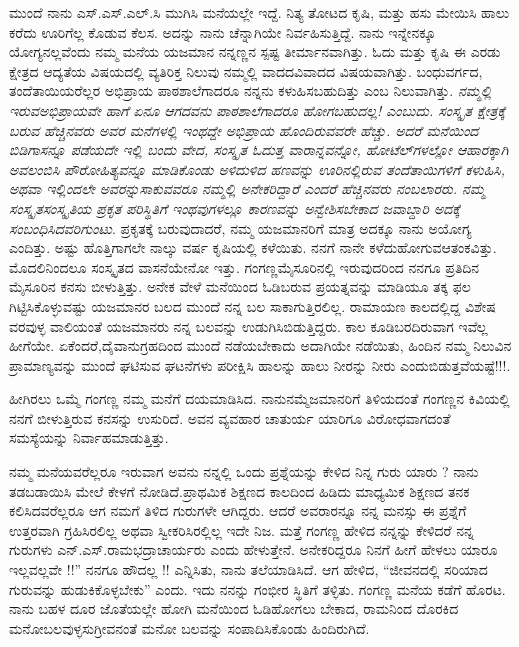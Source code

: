 {ಮುಂದೆ ನಾನು ಎಸ್.ಎಸ್.ಎಲ್.ಸಿ ಮುಗಿಸಿ ಮನೆಯಲ್ಲೇ ಇದ್ದೆ. ನಿತ್ಯ ತೋಟದ ಕೃಷಿ, ಮತ್ತು ಹಸು ಮೇಯಿಸಿ ಹಾಲು ಕರೆದು ಊರಿಗೆಲ್ಲ ಕೊಡುವ ಕೆಲಸ. ಅದನ್ನು ನಾನು ಚೆನ್ನಾಗಿಯೇ ನಿರ್ವಹಿಸುತ್ತಿದ್ದೆ. ನಾನು ಇನ್ನೇನಕ್ಕೂ ಯೋಗ್ಯನಲ್ಲವೆಂದು ನಮ್ಮ ಮನೆಯ ಯಜಮಾನ \enginline{-} ನನ್ನಣ್ಣನ ಸ್ಪಷ್ಟ ತೀರ್ಮಾನವಾಗಿತ್ತು. ಓದು ಮತ್ತು ಕೃಷಿ ಈ ಎರಡು ಕ್ಷೇತ್ರದ ಆದ್ಯತೆಯ ವಿಷಯದಲ್ಲಿ ವ್ಯತಿರಿಕ್ತ  ನಿಲುವು ನಮ್ಮಲ್ಲಿ ವಾದದ\enginline{-}ವಿವಾದದ ವಿಷಯವಾಗಿತ್ತು. ಬಂಧುವರ್ಗದ, ತಂದೆತಾಯಿಯರೆಲ್ಲರ ಅಭಿಪ್ರಾಯ ಪಾಠಶಾಲೆ\-ಗಾದರೂ ನನ್ನನು ಕಳುಹಿಸಬಹುದಿತ್ತು ಎಂಬ ನಿಲುವಾಗಿತ್ತು. \textit{ನಮ್ಮಲ್ಲಿ ಇರುವ\break ಅಭಿಪ್ರಾಯವೇ ಹಾಗೆ \enginline{-} ಏನೂ ಆಗದವನು ಪಾಠಶಾಲೆ\-ಗಾದರೂ \hbox{ಹೋಗಬಹುದಲ್ಲ!} ಎಂಬುದು. ಸಂಸ್ಕೃತ ಕ್ಷೇತ್ರಕ್ಕೆ ಬರುವ ಹೆಚ್ಚಿನವರು ಅವರ ಮನೆಗಳಲ್ಲಿ ಇಂಥದ್ದೇ ಅಭಿಪ್ರಾಯ ಹೊಂದಿರುವವರೇ ಹೆಚ್ಚು. ಅದರೆ ಮನೆಯಿಂದ ಬಿಡಿಗಾಸನ್ನೂ ಪಡೆಯದೇ ಇಲ್ಲಿ ಬಂದು ವೇದ, ಸಂಸ್ಕೃತ ಓದುತ್ತ ವಾರಾನ್ನವನ್ನೋ, ಹೋಟೆಲ್‌ಗಳಲ್ಲೋ ಆಹಾರಕ್ಕಾಗಿ ಅವಲಂಬಿಸಿ ಪೌರೋಹಿತ್ಯವನ್ನೂ ಮಾಡಿಕೊಂಡು ಅಳಿದುಳಿದ ಹಣವನ್ನು ಊರಿನಲ್ಲಿರುವ ತಂದೆತಾಯಿಗಳಿಗೆ ಕಳುಹಿಸಿ, ಅಥವಾ ಇಲ್ಲಿಂದಲೇ ಅವರನ್ನು\break ಸಾಕುವವರೂ ನಮ್ಮಲ್ಲಿ ಅನೇಕರಿದ್ದಾರೆ ಎಂದರೆ ಹೆಚ್ಚಿನವರು ನಂಬಲಾರರು. ನಮ್ಮ ಸಂಸ್ಕೃತ\enginline{-}ಸಂಸ್ಕೃತಿಯ ಪ್ರಕೃತ ಪರಿಸ್ಥಿತಿಗೆ ಇಂಥವುಗಳಲ್ಲೂ ಕಾರಣವನ್ನು ಅನ್ವೇಶಿಸ\-ಬೇಕಾದ ಜವಾಬ್ದಾರಿ ಅದಕ್ಕೆ ಸಂಬಂಧಿಸಿದವರಿಗುಂಟು}.  ಪ್ರಕೃತಕ್ಕೆ ಬರುವುದಾದರೆ, ನಮ್ಮ ಯಜಮಾನರಿಗೆ ಮಾತ್ರ ಅದಕ್ಕೂ ನಾನು ಅಯೋಗ್ಯ ಎಂದಿತ್ತು.  ಅಷ್ಟು ಹೊತ್ತಿಗಾಗಲೇ ನಾಲ್ಕು ವರ್ಷ ಕೃಷಿಯಲ್ಲಿ ಕಳೆಯಿತು. ನನಗೆ ನಾನೇ ಕಳೆದುಹೋಗುವ\break ಆತಂಕವಿತ್ತು. ಮೊದಲಿನಿಂದಲೂ ಸಂಸ್ಕೃತದ ವಾಸನೆಯೇನೋ ಇತ್ತು. ಗಂಗಣ್ಣ\break ಮೈಸೂರಿನಲ್ಲಿ ಇರುವುದರಿಂದ ನನಗೂ ಪ್ರತಿದಿನ  ಮೈಸೂರಿನ  ಕನಸು ಬೀಳುತ್ತಿತ್ತು. ಅನೇಕ ವೇಳೆ ಮನೆಯಿಂದ ಓಡಿಬರುವ ಪ್ರಯತ್ನವನ್ನು ಮಾಡಿಯೂ ತಕ್ಕ ಫಲ ಗಿಟ್ಟಿಸಿ\-ಕೊಳ್ಳುವಷ್ಟು ಯಜಮಾನರ ಬಲದ ಮುಂದೆ ನನ್ನ ಬಲ ಸಾಕಾಗುತ್ತಿರಲಿಲ್ಲ. ರಾಮಾಯಣ ಕಾಲದಲ್ಲಿದ್ದ ವಿಶೇಷ ವರವುಳ್ಳ ವಾಲಿಯಂತೆ ಯಜಮಾನರು ನನ್ನ ಬಲವನ್ನು ಉಡುಗಿಸಿಬಿಡುತ್ತಿದ್ದರು. ಕಾಲ ಕೂಡಿಬರದಿರುವಾಗ ಇವೆಲ್ಲ ಹೀಗೆಯೇ. ಏಕೆಂದರೆ,\break ದೈವಾನುಗ್ರಹದಿಂದ ಮುಂದೆ ನಡೆಯಬೇಕಾದು ಅದಾಗಿಯೇ ನಡೆಯಿತು, \enginline{-} ಹಿಂದಿನ ನಮ್ಮ ನಿಲುವಿನ ಪ್ರಾಮಾಣ್ಯವನ್ನು ಮುಂದೆ ಘಟಿಸುವ ಘಟನೆಗಳು ಪರೀಕ್ಷಿಸಿ ಹಾಲನ್ನು ಹಾಲು ನೀರನ್ನು ನೀರು ಎಂದುಬಿಡುತ್ತವೆಯಷ್ಟೆ!!!.

ಹೀಗಿರಲು ಒಮ್ಮೆ ಗಂಗಣ್ಣ ನಮ್ಮ ಮನೆಗೆ ದಯಮಾಡಿಸಿದ. ನಾನು\break ನಮ್ಮೆಜಮಾನರಿಗೆ ತಿಳಿಯದಂತೆ ಗಂಗಣ್ಣನ ಕಿವಿಯಲ್ಲಿ ನನಗೆ ಬೀಳುತ್ತಿರುವ ಕನಸನ್ನು ಉಸುರಿದೆ. ಅವನ ವ್ಯವಹಾರ ಚಾತುರ್ಯ ಯಾರಿಗೂ ವಿರೋಧವಾಗದಂತೆ ಸಮಸ್ಯೆಯನ್ನು ನಿರ್ವಾಹಮಾಡುತ್ತಿತ್ತು. 

ನಮ್ಮ ಮನೆಯವರೆಲ್ಲರೂ ಇರುವಾಗ ಅವನು ನನ್ನಲ್ಲಿ ಒಂದು ಪ್ರಶ್ನೆಯನ್ನು ಕೇಳಿದ \enginline{-} ನಿನ್ನ ಗುರು ಯಾರು ? ನಾನು ತಡಬಡಾಯಿಸಿ ಮೇಲೆ ಕೇಳಗೆ ನೋಡಿದೆ.\break ಪ್ರಾಥಮಿಕ ಶಿಕ್ಷಣದ ಕಾಲದಿಂದ ಹಿಡಿದು ಮಾಧ್ಯಮಿಕ ಶಿಕ್ಷಣದ ತನಕ \hbox{ಕಲಿಸಿದವರೆಲ್ಲರೂ} ಆಗ ನಮಗೆ ತಿಳಿದ ಗುರುಗಳೇ ಆಗಿದ್ದರು. ಆದರೆ ಅವರಾರನ್ನೂ ನನ್ನ ಮನಸ್ಸು ಈ ಪ್ರಶ್ನೆಗೆ ಉತ್ತರವಾಗಿ ಗ್ರಹಿಸಿರಲಿಲ್ಲ ಅಥವಾ ಸ್ವೀಕರಿಸಿರಲ್ಲಿಲ್ಲ \enginline{-} ಇದೇ ನಿಜ.  ಮತ್ತೆ ಗಂಗಣ್ಣ ಹೇಳಿದ \enginline{-} ನನ್ನನ್ನು ಕೇಳಿದರೆ ನನ್ನ ಗುರುಗಳು ಎನ್.ಎಸ್.ರಾಮಭದ್ರಾಚಾರ್ಯರು ಎಂದು ಹೇಳುತ್ತೇನೆ. ಅನೇಕರಿದ್ದರೂ ನಿನಗೆ ಹೀಗೆ ಹೇಳಲು ಯಾರೂ ಇಲ್ಲವಲ್ಲವೇ !!”  ನನಗೂ ಹೌದಲ್ಲ !! ಎನ್ನಿಸಿತು, ನಾನು ತಲೆಯಾಡಿಸಿದೆ. ಆಗ ಹೇಳಿದ, “ಜೀವನದಲ್ಲಿ ಸರಿಯಾದ ಗುರುವನ್ನು ಹುಡುಕಿಕೊಳ್ಳಬೇಕು” ಎಂದು. ಇದು ನನನ್ನು ಗಂಭೀರ ಸ್ಥಿತಿಗೆ ತಳ್ಳಿತು. ಗಂಗಣ್ಣ ಮನೆಯ ಕಡೆಗೆ ಹೊರಟ. ನಾನು ಬಹಳ ದೂರ ಜೊತೆಯಲ್ಲೇ ಹೋಗಿ ಮನೆಯಿಂದ ಓಡಿಹೋಗಲು ಬೇಕಾದ, ರಾಮನಿಂದ ದೊರಕಿದ ಮನೋಬಲವುಳ್ಳ\break ಸುಗ್ರೀವನಂತೆ ಮನೋ ಬಲವನ್ನು ಸಂಪಾದಿಸಿಕೊಂಡು  ಹಿಂದಿರುಗಿದೆ. 

}

